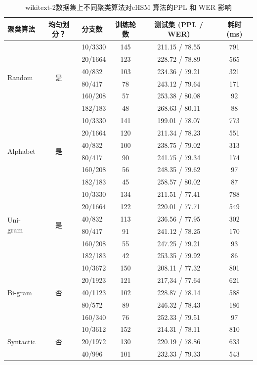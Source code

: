\begin{table}[!t]
  \centering
  \caption{wikitext-2数据集上不同聚类算法对cHSM 算法的PPL 和 WER 影响\label{table:clustering}}
  \begin{tabular}{lclccc} \toprule
聚类算法 & 均匀划分？&分支数& 训练轮数& 测试集 (PPL / WER)&耗时 (ms)\\ \midrule
  \multirow{6}{*}{Random}  &\multirow{6}{*}{是}&10/3330&145&211.15 / 78.55 &791\\
    &&20/1664&123&228.72 / 78.89&565\\
    &&40/832&103&234.36 / 79.21&321\\
    &&80/417&78&243.12 / 79.64&171\\
    &&160/208 &57&253.38 / 80.08&92\\
    &&182/183&48&268.63 / 80.11&88\\
  \midrule
  \multirow{6}{*}{Alphabet}  &\multirow{6}{*}{是}&10/3330 &141&199.01 / 78.07 &773\\
    &&20/1664 &120&211.34 / 78.23&551\\
    &&40/832 &100&238.75 / 79.02&313\\
    &&80/417 &90&241.75 / 79.34&174\\
    &&160/208 &56&248.35 / 79.62&97\\
    &&182/183&45&258.57 / 80.02&87\\
  \midrule
  \multirow{6}{*}{Uni-gram}   &\multirow{6}{*}{是} &10/3330&134&211.51 / 77.41 &788\\
    & &20/1664&122&220.01 / 77.71&549\\
    & &40/832&113&236.56 / 77.95&302\\
    & &80/417&91& 241.12 / 78.25&170\\
    & &160/208&55&247.25 / 79.21&93\\
    & &182/183&42&253.35 / 79.92&86\\
  \midrule
  \multirow{5}{*}{Bi-gram}   &\multirow{5}{*}{否}&10/3672&150&208.11 / 77.32&801\\
     &&20/1923&121&217,34 / 77.64&621\\
     &&40/1123&102&228.87 / 78.14&588\\
     &&80/572&89&246.32 / 78.43&186\\
     &&160/340&76&252.33 / 79.51&97\\
  \midrule
  \multirow{5}{*}{Syntactic}  &\multirow{5}{*}{否}&10/3612 &152&214.31 / 78.11&810\\
    &&20/1972 &130&220.19 / 78.86&633\\
    &&40/996 &101&232.33 / 79.33&543\\

\end{tabular}
\end{table}
